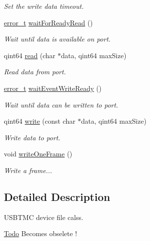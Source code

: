\begin{DoxyCompactItemize}
\begin{DoxyCompactList}\small\item\em Set the write data timeout. \end{DoxyCompactList}\item 
\hyperlink{classmdt_abstract_port_ad4121bb930c95887e77f8bafa065a85e}{error\_\-t} \hyperlink{classmdt_usbtmc_port_a3c1b746acfc06857eee4b4c136cd65ad}{waitForReadyRead} ()
\begin{DoxyCompactList}\small\item\em Wait until data is available on port. \end{DoxyCompactList}\item 
qint64 \hyperlink{classmdt_usbtmc_port_a91f45336ca9a71284e0309182f5e8ca1}{read} (char $\ast$data, qint64 maxSize)
\begin{DoxyCompactList}\small\item\em Read data from port. \end{DoxyCompactList}\item 
\hyperlink{classmdt_abstract_port_ad4121bb930c95887e77f8bafa065a85e}{error\_\-t} \hyperlink{classmdt_usbtmc_port_a24cfc5233e09b9dbcdb2adc5f700dc4a}{waitEventWriteReady} ()
\begin{DoxyCompactList}\small\item\em Wait until data can be written to port. \end{DoxyCompactList}\item 
qint64 \hyperlink{classmdt_usbtmc_port_a32b98d2a61617293c328a343d62d52c3}{write} (const char $\ast$data, qint64 maxSize)
\begin{DoxyCompactList}\small\item\em Write data to port. \end{DoxyCompactList}\item 
void \hyperlink{classmdt_usbtmc_port_a97fca5f136f232275d90ab5b8c5ce285}{writeOneFrame} ()
\begin{DoxyCompactList}\small\item\em Write a frame... \end{DoxyCompactList}\end{DoxyCompactItemize}


\subsection{Detailed Description}
USBTMC device file calss. 

\begin{Desc}
\item[\hyperlink{todo__todo000010}{Todo}]Becomes obselete ! \end{Desc}



